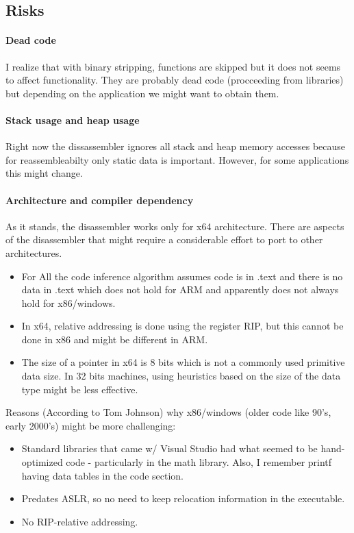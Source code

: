 \documentclass[]{llncs}
\begin{document}
\subsection{Risks}

\paragraph{Dead code}
I realize that with binary stripping, functions are skipped but it does not seems to
affect functionality. They are probably dead code (procceeding from libraries)
but depending on the application we might want to obtain them.

\paragraph{Stack usage and heap usage}
Right now the dissassembler ignores all stack and heap memory accesses because for
reassembleabilty only static data is important.
However, for some applications this might change.

\paragraph{Architecture and compiler dependency}
As it stands, the disassembler works only for x64 architecture. There
are aspects of the disassembler that might require a considerable
effort to port to other architectures.

\begin{itemize}
\item For All the code inference algorithm assumes code
  is in .text and there is no data in .text which does not hold for ARM and apparently
  does not always hold for x86/windows.

\item 
  In x64, relative addressing is done using the register RIP, but this
  cannot be done in x86 and might be different in ARM.

\item
  The size of a pointer in x64 is 8 bits which is not a commonly used
  primitive data size. In 32 bits machines, using heuristics based on the
  size of the data type might be less effective.

\end{itemize}

Reasons (According to Tom Johnson) why x86/windows (older code like
90's, early 2000's) might be more challenging:
\begin{itemize}
\item Standard libraries that came w/ Visual Studio had what seemed to
  be hand-optimized code - particularly in the math library. Also, I
  remember printf having data tables in the code section.
\item Predates ASLR, so no need to keep relocation information in the
  executable.
\item No RIP-relative addressing. 
\end{itemize}




\end{document}
